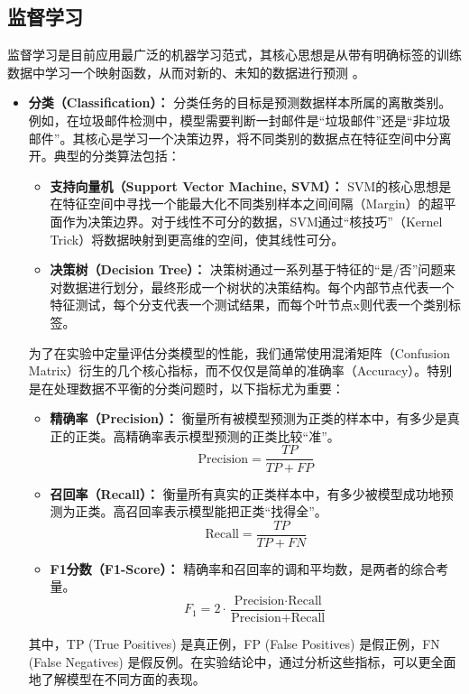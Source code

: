 \subsection{监督学习}
\label{ssec:supervised_learning}
监督学习是目前应用最广泛的机器学习范式，其核心思想是从带有明确标签的训练数据中学习一个映射函数，从而对新的、未知的数据进行预测 \cite{rani2023self}。
\begin{itemize}
    \item \textbf{分类（Classification）：} 分类任务的目标是预测数据样本所属的离散类别。例如，在垃圾邮件检测中，模型需要判断一封邮件是“垃圾邮件”还是“非垃圾邮件”。其核心是学习一个决策边界，将不同类别的数据点在特征空间中分离开。典型的分类算法包括：
        \begin{itemize}
            \item \textbf{支持向量机（Support Vector Machine, SVM）：} SVM的核心思想是在特征空间中寻找一个能最大化不同类别样本之间间隔（Margin）的超平面作为决策边界。对于线性不可分的数据，SVM通过“核技巧”（Kernel Trick）将数据映射到更高维的空间，使其线性可分。
            \item \textbf{决策树（Decision Tree）：} 决策树通过一系列基于特征的“是/否”问题来对数据进行划分，最终形成一个树状的决策结构。每个内部节点代表一个特征测试，每个分支代表一个测试结果，而每个叶节点x则代表一个类别标签。
        \end{itemize}
        为了在实验中定量评估分类模型的性能，我们通常使用混淆矩阵（Confusion Matrix）衍生的几个核心指标，而不仅仅是简单的准确率（Accuracy）。特别是在处理数据不平衡的分类问题时，以下指标尤为重要：
			\begin{itemize}
				\item \textbf{精确率（Precision）：} 衡量所有被模型预测为正类的样本中，有多少是真正的正类。高精确率表示模型预测的正类比较“准”。
				\[
					\text{Precision} = \frac{TP}{TP + FP}
				\]
				\item \textbf{召回率（Recall）：} 衡量所有真实的正类样本中，有多少被模型成功地预测为正类。高召回率表示模型能把正类“找得全”。
				\[
					\text{Recall} = \frac{TP}{TP + FN}
				\]
				\item \textbf{F1分数（F1-Score）：} 精确率和召回率的调和平均数，是两者的综合考量。
				\[
					F_1 = 2 \cdot \frac{\text{Precision} \cdot \text{Recall}}{\text{Precision} + \text{Recall}}
				\]
			\end{itemize}
				其中，TP (True Positives) 是真正例，FP (False Positives) 是假正例，FN (False Negatives) 是假反例。在实验结论中，通过分析这些指标，可以更全面地了解模型在不同方面的表现。


\end{itemize}
